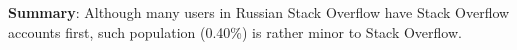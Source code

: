 \textbf{Summary}: Although many users in Russian Stack Overflow have Stack Overflow accounts first, such population (0.40\%) is rather minor to  Stack Overflow.

